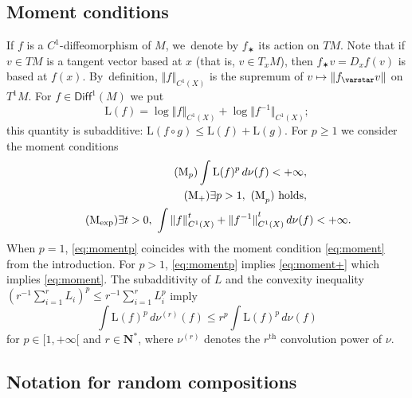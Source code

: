 \documentclass[JEP,XML,SOM,Unicode,published]{cedram}
\newcommand\mto{\mathchoice{\longmapsto}{\mapsto}{\mapsto}{\mapsto}}
\newcommand{\norm}[1]{{\left\Vert#1\right\Vert}}
\newcommand{\anorm}[1]{{\Vert#1\Vert}}
\newcommand{\inv}{^{-1}}
\def\N{\mathbf{N}}
\newcommand\Diff{{\mathsf{Diff}}}
\theoremstyle{plain}
\theoremstyle{definition}
\begin{document}
\subsection{Moment conditions}\label{subs:moment}
If $f$ is a $C^1$-diffeomorphism of $M$, we~denote by $f_\varstar $ its action on $TM$. Note that
if $v\in TM$ is a tangent vector based at $x$ (that is, $v\in T_xM$), then
$f_\varstar v = D_xf(v)$ is based at $f(x)$. By~definition, $\norm{f}_{C^1(X)}$ is the supremum of
$v\mto \norm{f_\varstar v}$ on $T^1M$.
For $f\in \Diff^1(M)$ we put
\begin{equation}\label{eq:subadditive_function_L}
\mathrm L(f) = \log\norm{f}_{C^1(X)}+ \log\anorm{f\inv}_{C^1(X)};
\end{equation}
this quantity is subadditive: $\mathrm L(f\circ g)\leq \mathrm L(f)+\mathrm L(g)$.
For $p\geq 1$ we consider the moment conditions
\begin{align}\label{eq:momentp}
\tag{M$_p$}
\int \mathrm L(f)^p \, d\nu (f) < + \infty, \quad \quad \quad \quad\\
\label{eq:moment+}
\tag{M$_+$}
\exists p>1, \ \mathrm{(M}_p\mathrm{)} \text{ holds}, \quad \quad \quad\quad \\
\label{eq:momentexp}
\tag{M$_{\exp}$}
\exists t>0, \ \int \norm{f}^t_{C^1(X)}+ \anorm{f\inv}^t_{C^1(X)} \, d\nu (f) < + \infty.
\end{align}
When $p=1$, \eqref{eq:momentp} coincides with the moment condition \eqref{eq:moment} from the introduction. For $p>1$, \eqref{eq:momentp}
implies \eqref{eq:moment+} which implies \eqref{eq:moment}.
The subadditivity of $L$ and the convexity inequality
$(r\inv \sum_{i=1}^r L_i)^p\leq r\inv \sum_{i=1}^r L_i^p$ imply
\begin{equation}\label{eq:Mp_iteree}
\int \mathrm L(f)^p \, d\nu^{(r)} (f) \leq r^{p} \int \mathrm L(f)^p \, d\nu (f)
\end{equation}
for $p\in [1,+\infty[$ and $r\in \N^*$, where $\nu^{(r)}$ denotes the $r^\mathrm{th}$ convolution power of $\nu$.

\subsection{Notation for random compositions} \label{subs:notation}
\end{document}
